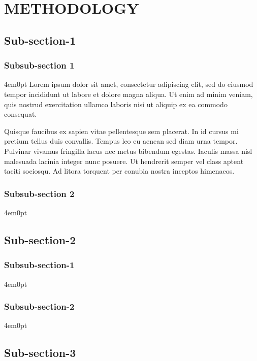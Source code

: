 \renewcommand{\thechapter}{\Roman{chapter}}
\chapter[]{METHODOLOGY}
\renewcommand{\thechapter}{\arabic{chapter}}
\begingroup
\fontsize{12bp}{\baselineskip}\selectfont
\section{Sub-section-1}

	\subsection{Subsub-section 1}
		\begin{indentedblock}{4em}{0pt}
			Lorem ipsum dolor sit amet, consectetur adipiscing elit, sed do eiusmod tempor incididunt ut labore et dolore magna aliqua. Ut enim ad minim veniam, quis nostrud exercitation ullamco laboris nisi ut aliquip ex ea commodo consequat. 
			
			
			Quisque faucibus ex sapien vitae pellentesque sem placerat. In id cursus mi pretium tellus duis convallis. Tempus leo eu aenean sed diam urna tempor. Pulvinar vivamus fringilla lacus nec metus bibendum egestas. Iaculis massa nisl malesuada lacinia integer nunc posuere. Ut hendrerit semper vel class aptent taciti sociosqu. Ad litora torquent per conubia nostra inceptos himenaeos.
		\end{indentedblock}
	\subsection{Subsub-section 2}
		\begin{indentedblock}{4em}{0pt}
		\end{indentedblock}
\section{Sub-section-2}

	\subsection{Subsub-section-1}
		\begin{indentedblock}{4em}{0pt}
		\end{indentedblock}
	\subsection{Subsub-section-2}
		\begin{indentedblock}{4em}{0pt}
		\end{indentedblock}
		
\section{Sub-section-3}
\endgroup